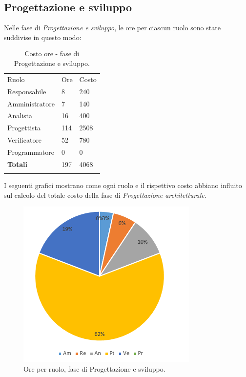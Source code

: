 \documentclass[a4paper]{article}
\begin{document}
		\subsection{Progettazione e sviluppo}
			Nelle fase di \emph{Progettazione e sviluppo}, le ore per ciascun ruolo sono state suddivise in questo modo:
			\begin{table}[H]
				\begin{tabularx}{\textwidth}{Y Y Y}
					Ruolo & Ore & Costo \\
					Responsabile & 8 & 240 \\
					Amministratore & 7 & 140 \\
					Analista & 16 & 400\\
					Progettista & 114 & 2508\\
					Verificatore & 52 & 780\\
					Programmatore & 0 & 0 \\
					\textbf{Totali} & 197 & 4068 \\
				\end{tabularx}
				\caption{Costo ore - fase di Progettazione e sviluppo. } 
				\label{TCProgettazione}
			\end{table}
			I seguenti grafici mostrano come ogni ruolo e il rispettivo costo abbiano influito sul calcolo del totale 
			costo della fase di \emph{Progettazione architetturale}.
			\begin{figure}[H]
				\centering
				\includegraphics[scale=0.7]{pc_sviluppo}
				\caption{Ore per ruolo, fase di Progettazione e sviluppo.}
			\end{figure}
\end{document}
